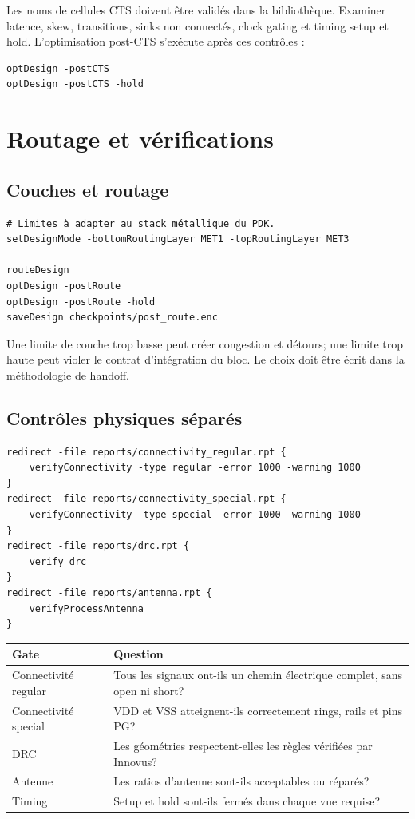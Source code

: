 \documentclass[11pt,a4paper,openany]{report}
\begin{document}
Les noms de cellules CTS doivent être validés dans la bibliothèque. Examiner
latence, skew, transitions, sinks non connectés, clock gating et timing setup
et hold. L'optimisation post-CTS s'exécute après ces contrôles :

\begin{lstlisting}[style=guidecode,language=TclGuide]
optDesign -postCTS
optDesign -postCTS -hold
\end{lstlisting}

\chapter{Routage et vérifications}

\section{Couches et routage}

\begin{lstlisting}[style=guidecode,language=TclGuide]
# Limites à adapter au stack métallique du PDK.
setDesignMode -bottomRoutingLayer MET1 -topRoutingLayer MET3

routeDesign
optDesign -postRoute
optDesign -postRoute -hold
saveDesign checkpoints/post_route.enc
\end{lstlisting}

Une limite de couche trop basse peut créer congestion et détours; une limite
trop haute peut violer le contrat d'intégration du bloc. Le choix doit être
écrit dans la méthodologie de handoff.

\section{Contrôles physiques séparés}

\begin{lstlisting}[style=guidecode,language=TclGuide]
redirect -file reports/connectivity_regular.rpt {
    verifyConnectivity -type regular -error 1000 -warning 1000
}
redirect -file reports/connectivity_special.rpt {
    verifyConnectivity -type special -error 1000 -warning 1000
}
redirect -file reports/drc.rpt {
    verify_drc
}
redirect -file reports/antenna.rpt {
    verifyProcessAntenna
}
\end{lstlisting}

\begin{longtable}{p{}p{}}
\toprule
Gate & Question \\
\midrule
Connectivité regular & Tous les signaux ont-ils un chemin électrique complet,
sans open ni short? \\
Connectivité special & VDD et VSS atteignent-ils correctement rings, rails et
pins PG? \\
DRC & Les géométries respectent-elles les règles vérifiées par Innovus? \\
Antenne & Les ratios d'antenne sont-ils acceptables ou réparés? \\
Timing & Setup et hold sont-ils fermés dans chaque vue requise? \\
\bottomrule
\end{longtable}
\end{document}
